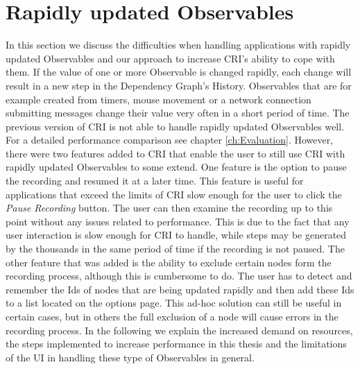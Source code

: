 \section{Rapidly updated Observables}
\label{sec:RapidlyUpdatedObservables}
In this section we discuss the difficulties when handling applications with rapidly updated Observables and our approach to increase CRI's ability to cope with them. If the value of one or more Observable is changed rapidly, each change will result in a new step in the Dependency Graph's History. Observables that are for example created from timers, mouse movement or a network connection submitting messages change their value very often in a short period of time. The previous version of CRI is not able to handle rapidly updated Observables well. For a detailed performance comparison see chapter \ref{ch:Evaluation}. However, there were two features added to CRI that enable the user to still use CRI with rapidly updated Observables to some extend. One feature is the option to pause the recording and resumed it at a later time. This feature is useful for applications that exceed the limits of CRI slow enough for the user to click the \emph{Pause Recording} button. The user can then examine the recording up to this point without any issues related to performance. This is due to the fact that any user interaction is slow enough for CRI to handle, while steps may be generated by the thousands in the same period of time if the recording is not paused. The other feature that was added is the ability to exclude certain nodes form the recording process, although this is cumbersome to do. The user has to detect and remember the Ids of nodes that are being updated rapidly and then add these Ids to a list located on the options page. This ad-hoc solution can still be useful in certain cases, but in others the full exclusion of a node will cause errors in the recording process. In the following we explain the increased demand on resources, the steps implemented to increase performance in this thesis and the limitations of the UI in handling these type of Observables in general. 

